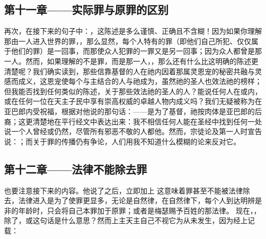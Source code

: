 
\subsection{第十一章——实际罪与原罪的区别}

再次，在接下来的句子中：，这陈述是多么谨慎、正确且不含糊！因为如果你理解那由一人进入世界的罪，，那么显然，每个人特有的罪（即他们自己所犯、仅仅属于他们的罪）是一回事，而那使众人犯罪的一罪又是另一回事；因为众人都曾是那一人。然而，如果理解的不是罪，而是那一人，，那么还有什么比这明确的陈述更清楚呢？我们确实读到，那些信靠基督的人在祂内因着那属灵恩宠的秘密共融与灵感而成义，这恩宠使每个与主结合的人与祂成为，虽然祂的圣人也效法祂的榜样；但我能否找到任何类似的陈述，关于那些效法祂的圣人的人？能说任何人在或内，或在任何一位在天主子民中享有崇高权威的卓越人物内成义吗？我们无疑被称为在亚巴郎内受祝福，根据对他说的那句话：——是为了基督，祂按肉体是亚巴郎的后裔；这更清楚地在平行经文中表达出来：我不相信任何人能在圣经中找到任何一处说一个人曾经或仍然，尽管所有邪恶不敬的人都他。然而，宗徒论及第一人时宣告说：；而关于罪的传播仍有争论，人们用我不知道什么模糊的论来反对它。\par


\subsection{第十二章——法律不能除去罪}

也要注意接下来的内容。他说了之后，立即加上 这意味着罪甚至不能被法律除去，法律进入是为了使罪更显多，无论是自然律，在自然律下，每个人到达明辨是非的年龄时，只会将自己本罪加于原罪；或者是梅瑟赐予百姓的那法律。   现在，，除了，或这句话是什么意思？然而上主天主自己不视它为从未发生，因为经上记载： \par

